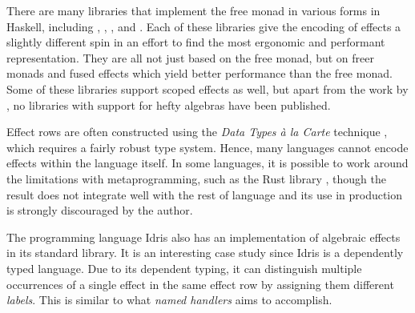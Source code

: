 There are many libraries that implement the free monad in various forms in Haskell, including , , , and . Each of these libraries give the encoding of effects a slightly different spin in an effort to find the most ergonomic and performant representation. They are all not just based on the free monad, but on freer monads \autocite{kiselyov_freer_2016} and fused effects \autocite{hinze_fusion_2015} which yield better performance than the free monad. Some of these libraries support scoped effects as well, but apart from the work by \textcite{bach_poulsen_hefty_2023}, no libraries with support for hefty algebras have been published.

Effect rows are often constructed using the \emph{Data Types à la Carte} technique \autocite{swierstra_data_2008}, which requires a fairly robust type system. Hence, many languages cannot encode effects within the language itself. In some languages, it is possible to work around the limitations with metaprogramming, such as the Rust library , though the result does not integrate well with the rest of language and its use in production is strongly discouraged by the author.

The programming language Idris \autocite{brady_programming_2013} also has an implementation of algebraic effects in its standard library. It is an interesting case study since Idris is a dependently typed language. Due to its dependent typing, it can distinguish multiple occurrences of a single effect in the same effect row by assigning them different \emph{labels}. This is similar to what \emph{named handlers} \autocite{xie_first-class_2022} aims to accomplish.
